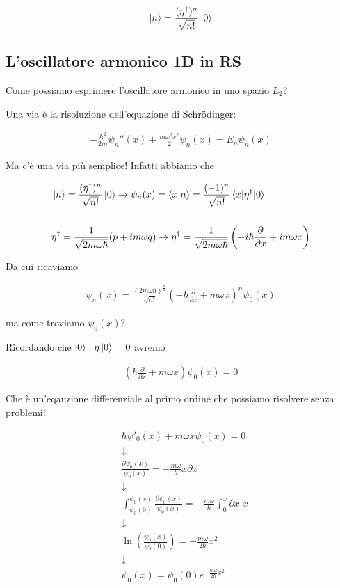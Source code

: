\begin{align}
\ket{n}= \frac{(\eta^\dagger)^n}{\sqrt{n!}}\ket{0}
\end{align}


\newpage
\subsection{L'oscillatore armonico 1D in RS}

Come possiamo esprimere l'oscillatore armonico in uno spazio $L_2$?

Una via è la risoluzione dell'equazione di Schrödinger:

\begin{align}
-\frac{\hbar^2}{2m}\psi_n''(x)+\frac{m\omega^2x^2}{2}\psi_n(x)=E_n\psi_n(x) 
\end{align}

Ma c'è una via più semplice! Infatti abbiamo che

\begin{align}
{}&\ket{n}= \frac{(\eta^\dagger)^n}{\sqrt{n!}}\ket{0} \rightarrow \psi_n(x)= \braket{x|n}= \frac{(-1)^n}{\sqrt{n!}}\braket{x|\eta^\dagger|0} \\
\nonumber \\
&\eta^\dagger = \frac{1}{\sqrt{2m\omega\hbar}}(p + im\omega q) \rightarrow \eta^\dagger= \frac{1}{\sqrt{2m\omega\hbar}} \left( -i\hbar \frac{\partial}{\partial x} + im\omega x \right)
\end{align}

Da cui ricaviamo

\begin{align}
\psi_n(x)= \frac{(2m\omega \hbar)^{\frac{n}{2}}}{\sqrt{n!}}\left( -\hbar \frac{\partial}{\partial x} + m\omega x \right)^n \psi_0(x)
\end{align}


ma come troviamo $\psi_0(x)$?

Ricordando che $\ket{0}: \eta\ket{0}=0$ avremo

\begin{align}
\left( \hbar \frac{\partial}{\partial x} + m\omega x \right) \psi_0(x) =0
\end{align}

Che è un'eqauzione differenziale al primo ordine che possiamo risolvere senza problemi!

\begin{align}
{}&\hbar \psi'_0(x) + m\omega x \psi_0(x)=0 \nonumber \\
& \downarrow \nonumber \\
& \frac{\partial \psi_0(x)}{\psi_0(x)} = -\frac{m\omega}{\hbar} x \partial x  \nonumber \\
& \downarrow \nonumber \\
& \int_{\psi_0(0)}^{\psi_0(x)} \frac{\partial \psi_0(x)}{\psi_0(x)} = -\frac{m\omega}{\hbar} \int_{0}^{x} \partial x \; x  \nonumber \\
& \downarrow \nonumber \\
& \ln(\frac{\psi_0(x)}{\psi_0(0)}) = -\frac{m\omega}{2\hbar}x^2 \nonumber \\
& \downarrow \nonumber \\
& \psi_0(x) = \psi_0(0) e^{-\frac{m\omega}{2\hbar}x^2}
\end{align}

